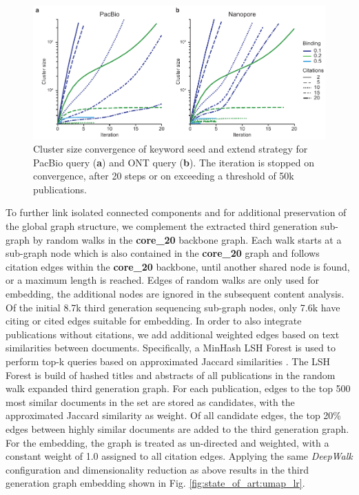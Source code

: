 \begin{figure}[h]
	\centering
	\includegraphics[width=1.0\textwidth]{figures/state_of_art/cluster_convergence.pdf}
	\captionsetup{format=plain}
	\caption[Keyword Seed and Extend Convergence]{Cluster size convergence of keyword seed and extend strategy for PacBio query (\textbf{a}) and ONT query (\textbf{b}). The iteration is stopped on convergence, after 20 steps or on exceeding a threshold of 50k publications.}
	\label{fig:state_of_art:cluster_convergence}
\end{figure}

To further link isolated connected components and for additional preservation of the global graph structure, we complement the extracted third generation sub-graph by random walks in the \textbf{core\_20} backbone graph.
Each walk starts at a sub-graph node which is also contained in the \textbf{core\_20} graph and follows citation edges within the \textbf{core\_20} backbone, until another shared node is found, or a maximum length is reached.
Edges of random walks are only used for embedding, the additional nodes are ignored in the subsequent content analysis.
Of the initial 8.7k third generation sequencing sub-graph nodes, only 7.6k have citing or cited edges suitable for embedding.
In order to also integrate publications without citations, we add additional weighted edges based on text similarities between documents.
Specifically, a MinHash LSH Forest is used to perform top-k queries based on approximated Jaccard similarities \cite{Bawa2005}.
The LSH Forest is build of hashed titles and abstracts of all publications in the random walk expanded third generation graph.
For each publication, edges to the top 500 most similar documents in the set are stored as candidates, with the approximated Jaccard similarity as weight.
Of all candidate edges, the top 20\% edges between highly similar documents are added to the third generation graph.
For the embedding, the graph is treated as un-directed and weighted, with a constant weight of 1.0 assigned to all citation edges.
Applying the same \textit{DeepWalk} configuration and dimensionality reduction as above results in the third generation graph embedding shown in Fig. \ref{fig:state_of_art:umap_lr}.

